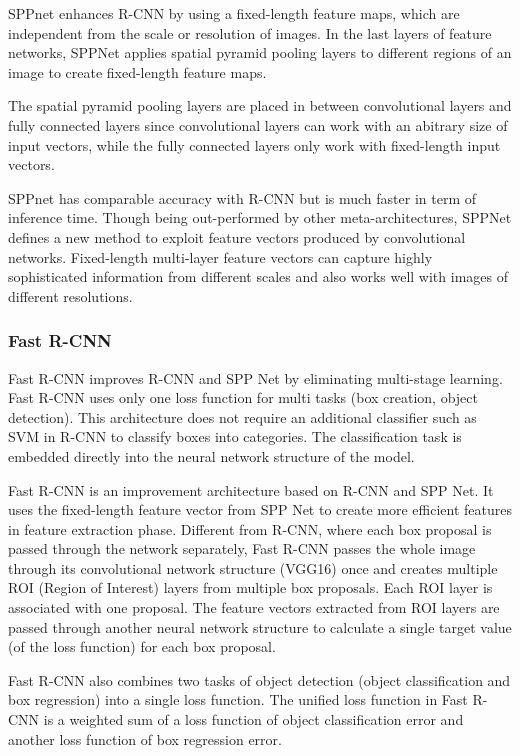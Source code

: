 \documentclass[conference]{IEEEtran}
\begin{document}
SPPnet enhances R-CNN by using a fixed-length feature maps, which are independent from the scale or resolution of images. In the last layers of feature networks, SPPNet applies spatial pyramid pooling layers to different regions of an image to create fixed-length feature maps.

The spatial pyramid pooling layers are placed in between convolutional layers and fully connected layers since convolutional layers can work with an abitrary size of input vectors, while the fully connected layers only work with fixed-length input vectors.

SPPnet has comparable accuracy with R-CNN but is much faster in term of inference time. Though being out-performed by other meta-architectures, SPPNet defines a new method to exploit feature vectors produced by convolutional networks. Fixed-length multi-layer feature vectors can capture highly sophisticated information from different scales and also works well with images of different resolutions.

\subsubsection{Fast R-CNN}
Fast R-CNN improves R-CNN and SPP Net by eliminating multi-stage learning. Fast R-CNN uses only one loss function for multi tasks (box creation, object detection). This architecture does not require an additional classifier such as SVM in R-CNN to classify boxes into categories. The classification task is embedded directly into the neural network structure of the model.

Fast R-CNN is an improvement architecture based on R-CNN and SPP Net. It uses the fixed-length feature vector from SPP Net to create more efficient features in feature extraction phase. Different from R-CNN, where each box proposal is passed through the network separately, Fast R-CNN passes the whole image through its convolutional network structure (VGG16) once and creates multiple ROI (Region of Interest) layers from multiple box proposals. Each ROI layer is associated with one proposal. The feature vectors extracted from ROI layers are passed through another neural network structure to calculate a single target value (of the loss function) for each box proposal.

Fast R-CNN also combines two tasks of object detection (object classification and box regression) into a single loss function. The unified loss function in Fast R-CNN is a weighted sum of a loss function of object classification error and another loss function of box regression error.
\end{document}
